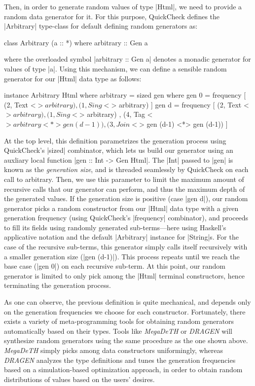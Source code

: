 %
Then, in order to generate random values of type |Html|, we need to provide a
random data generator for it.
%
For this purpose, QuickCheck defines the |Arbitrary| type-class for default
defining random generators as:

\begin{code}
class Arbitrary (a :: *) where
  arbitrary :: Gen a
\end{code}
%
where the overloaded symbol |arbitrary :: Gen a| denotes a monadic generator for
values of type |a|.
%
Using this mechanism, we can define a sensible random generator for our |Html|
data type as follows:

\begin{code}
instance Arbitrary Html where
  arbitrary = sized gen
    where  gen 0 = frequency
             [  (2,  Text    <$> arbitrary)
             ,  (1,  Sing    <$> arbitrary) ]
           gen d = frequency
             [  (2,  Text    <$> arbitrary)
             ,  (1,  Sing    <$> arbitrary)
             ,  (4,  Tag     <$> arbitrary  <*> gen (d-1))
             ,  (3,  Join    <$> gen (d-1)  <*> gen (d-1)) ]
\end{code} %
%
At the top level, this definition parametrizes the generation process using
QuickCheck's |sized| combinator, which lets us build our generator using an
auxliary local function |gen :: Int -> Gen Html|.
%
The |Int| passed to |gen| is known as the \emph{generation size}, and is
threaded seamlessly by QuickCheck on each call to arbitrary.
%
Then, we use this parameter to limit the maximum amount of recursive calls that
our generator can perform, and thus the maximum depth of the generated values.
%
If the generation size is positive (case |gen d|), our random generator picks a
random constructor from our |Html| data type with a given generation frequency
(using QuickCheck's |frequency| combinator), and proceeds to fill its fields
using randomly generated sub-terms---here using Haskell's applicative notation
\cite{Mcbride2008} and the default |Arbitrary| instance for |String|s.
%
For the case of the recursive sub-terms, this generator simply calls itself
recursively with a smaller generation size (|gen (d-1)|).
%
This process repeats until we reach the base case (|gen 0|) on each recursive
sub-term.
%
At this point, our random generator is limited to only pick among the |Html|
terminal constructors, hence terminating the generation process.


%
As one can observe, the previous definition is quite mechanical, and depends
only on the generation frequencies we choose for each constructor.
%
Fortunately, there exists a variety of meta-programming tools for obtaining
random generators automatically based on their types.
%
Tools like \emph{MegaDeTH} or \emph{DRAGEN} will synthesize random generators
using the same procedure as the one shown above.
%
\emph{MegaDeTH} simply picks among data constructors uniformingly, whereas
\emph{DRAGEN} analyzes the type definitions and tunes the generation frequencies
based on a simulation-based optimization approach, in order to obtain random
distributions of values based on the users' desires.


